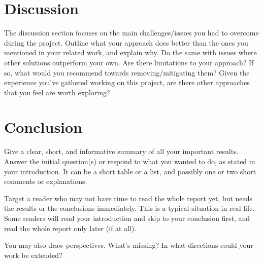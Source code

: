\documentclass{scrartcl}
\begin{document}
\section{Discussion}
The discussion section focuses on the main challenges/issues you had to overcome during the project. Outline what your approach does better than the ones you mentioned in your related work, and explain why. Do the same with issues where other solutions  outperform your own. Are there limitations to your approach? If so, what would you recommend towards removing/mitigating them? Given the experience you've gathered working on this project, are there other approaches that you feel are worth exploring?

\section{Conclusion}

Give a clear, short, and informative summary of all your important results. Answer the initial question(s) or respond to what you wanted to do, as stated in your introduction. It can be a short table or a list, and possibly one or two short comments or explanations. 

Target a reader who may not have time to read the whole report yet, but needs the results or the conclusions immediately. This is a typical situation in real life. Some readers will read your introduction and skip to your conclusion first, and read the whole report only later (if at all).

You may also draw perspectives. What's missing? In what directions could your work be extended?

\newpage
\singlespacing




\end{document}
